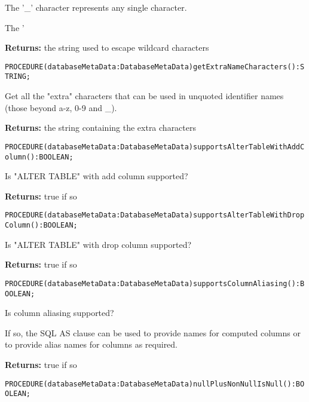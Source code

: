 The '\_' character represents any single character. 

The '%


{\bf Returns: } 
the string used to escape wildcard characters 




\verb'PROCEDURE(databaseMetaData:DatabaseMetaData)getExtraNameCharacters():STRING;'






Get all the "extra" characters that can be used in unquoted identifier names (those beyond a-z, 0-9 and \_). 


{\bf Returns: } 
the string containing the extra characters 




\verb'PROCEDURE(databaseMetaData:DatabaseMetaData)supportsAlterTableWithAddColumn():BOOLEAN;'






Is "ALTER TABLE" with add column supported? 


{\bf Returns: } 
true if so 




\verb'PROCEDURE(databaseMetaData:DatabaseMetaData)supportsAlterTableWithDropColumn():BOOLEAN;'






Is "ALTER TABLE" with drop column supported? 


{\bf Returns: } 
true if so 




\verb'PROCEDURE(databaseMetaData:DatabaseMetaData)supportsColumnAliasing():BOOLEAN;'






Is column aliasing supported? 

If so, the SQL AS clause can be used to provide names for computed columns or to provide alias names for columns as required.


{\bf Returns: } 
true if so 




\verb'PROCEDURE(databaseMetaData:DatabaseMetaData)nullPlusNonNullIsNull():BOOLEAN;'






